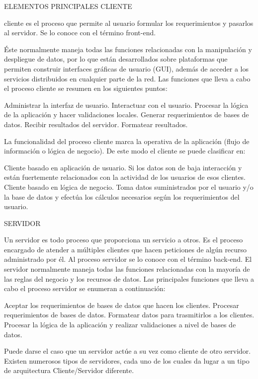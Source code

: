 ELEMENTOS PRINCIPALES
CLIENTE

cliente es el proceso que permite al usuario formular los requerimientos y pasarlos al servidor. Se lo conoce con el término front-end.

Éste normalmente maneja todas las funciones relacionadas con la manipulación y despliegue de datos, por lo que están desarrollados 
sobre plataformas que permiten construir interfaces gráficas de usuario (GUI), además de acceder a los servicios distribuidos en 
cualquier parte de la red. Las funciones que lleva a cabo el proceso cliente se resumen en los siguientes puntos:

    Administrar la interfaz de usuario.
    Interactuar con el usuario.
    Procesar la lógica de la aplicación y hacer validaciones locales.
    Generar requerimientos de bases de datos.
    Recibir resultados del servidor.
    Formatear resultados.

La funcionalidad del proceso cliente marca la operativa de la aplicación (flujo de información o lógica de negocio). De este modo el 
cliente se puede clasificar en:

    Cliente basado en aplicación de usuario. Si los datos son de baja interacción y están fuertemente relacionados con la actividad de 
    los usuarios de esos clientes.
    Cliente basado en lógica de negocio. Toma datos suministrados por el usuario y/o la base de datos y efectúa los cálculos necesarios 
    según los requerimientos del usuario.

SERVIDOR

Un servidor es todo proceso que proporciona un servicio a otros. Es el proceso encargado de atender a múltiples clientes que hacen peticiones 
de algún recurso administrado por él. Al proceso servidor se lo conoce con el término back-end. El servidor normalmente maneja todas las 
funciones relacionadas con la mayoría de las reglas del negocio y los recursos de datos. Las principales funciones que lleva a cabo el 
proceso servidor se enumeran a continuación:

    Aceptar los requerimientos de bases de datos que hacen los clientes.
    Procesar requerimientos de bases de datos.
    Formatear datos para trasmitirlos a los clientes.
    Procesar la lógica de la aplicación y realizar validaciones a nivel de bases de datos.

Puede darse el caso que un servidor actúe a su vez como cliente de otro servidor. Existen numerosos tipos de servidores, cada uno de los 
cuales da lugar a un tipo de arquitectura Cliente/Servidor diferente.

